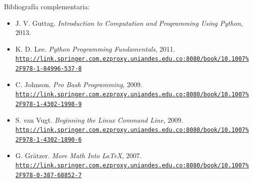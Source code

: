 \documentclass[letterpaper,10pt,onecolumn]{article}
\begin{document}
\noindent\normalsize Bibliografía complementaria:

\begin{itemize}
	\item J. V. Guttag. \textit{Introduction to Computation and Programming Using Python}, 2013.
	\item K. D. Lee. \textit{Python Programming Fundamentals}, 2011. \\
	\href{http://link.springer.com.ezproxy.uniandes.edu.co:8080/book/10.1007\%2F978-1-84996-537-8}{\nolinkurl{http://link.springer.com.ezproxy.uniandes.edu.co:8080/book/10.1007\%2F978-1-84996-537-8}}\\[-0.6cm]
	\item C. Johnson. \textit{Pro Bash Programming}, 2009. \\
	\href{http://link.springer.com.ezproxy.uniandes.edu.co:8080/book/10.1007\%2F978-1-4302-1998-9}{\nolinkurl{http://link.springer.com.ezproxy.uniandes.edu.co:8080/book/10.1007\%2F978-1-4302-1998-9}}
	\item S. van Vugt. \textit{Beginning the Linux Command Line}, 2009.\\
	\href{http://link.springer.com.ezproxy.uniandes.edu.co:8080/book/10.1007\%2F978-1-4302-1890-6}{\nolinkurl{http://link.springer.com.ezproxy.uniandes.edu.co:8080/book/10.1007\%2F978-1-4302-1890-6}}\\[-0.6cm]
	\item G. Gr\"atzer. \textit{More Math Into  \LaTeX}, 2007.\\
	\href{http://link.springer.com.ezproxy.uniandes.edu.co:8080/book/10.1007\%2F978-0-387-68852-7}{\nolinkurl{http://link.springer.com.ezproxy.uniandes.edu.co:8080/book/10.1007\%2F978-0-387-68852-7}}
\end{itemize}
\end{document}
